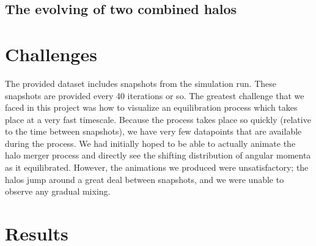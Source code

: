 \documentclass[12pt]{article}
\begin{document}
\subsection{The evolving of two combined halos}


\section{Challenges}
\label{sec:challenges}
The provided dataset includes snapshots from the simulation run. These
snapshots are provided every 40 iterations or so. The greatest challenge that
we faced in this project was how to visualize an equilibration process which
takes place at a very fast timescale. Because the process takes place so
quickly (relative to the time between snapshots), we have very few datapoints
that are available during the process. We had initially hoped to be able to
actually animate the halo merger process and directly see the shifting
distribution of angular momenta as it equilibrated. However, the animations we
produced were unsatisfactory; the halos jump around a great deal between
snapshots, and we were unable to observe any gradual mixing.

\section{Results}



\end{document}
